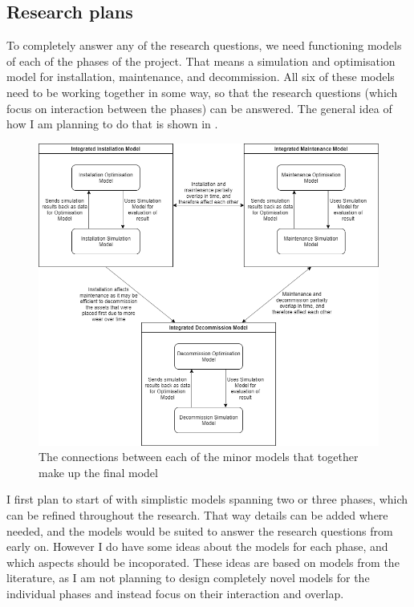 \documentclass[a4paper,12pt]{article}
\begin{document}
\subsection{Research plans} \label{ss:plans}
To completely answer any of the research questions, we need functioning models of each of the phases of the project. That means a simulation and optimisation model for installation, maintenance, and decommission. All six of these models need to be working together in some way, so that the research questions (which focus on interaction between the phases) can be answered. The general idea of how I am planning to do that is shown in . 

\begin{figure}[h]
\includegraphics[width = \textwidth]{OWF Tool interactions}
\caption{The connections between each of the minor models that together make up the final model}
\label{f:interact}
\end{figure}

I first plan to start of with simplistic models spanning two or three phases, which can be refined throughout the research. That way details can be added where needed, and the models would be suited to answer the research questions from early on. However I do have some ideas about the models for each phase, and which aspects should be incoporated. These ideas are based on models from the literature, as I am not planning to design completely novel models for the individual phases and instead focus on their interaction and overlap. 
\end{document}
